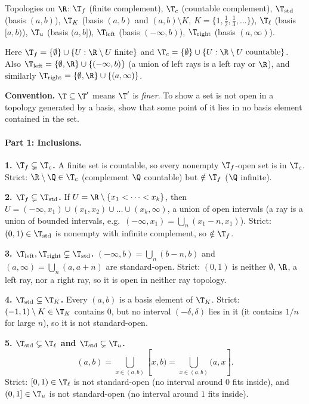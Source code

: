 
Topologies on $\R$: $\T_f$ (finite complement), $\T_c$ (countable complement), $\T_{\mathrm{std}}$
(basis $(a,b)$), $\T_K$ (basis $(a,b)$ and $(a,b)\setminus K$, $K=\{1,\tfrac12,\tfrac13,\dots\}$),
$\T_\ell$ (basis $[a,b)$), $\T_u$ (basis $(a,b]$), $\T_{\mathrm{left}}$ (basis $(-\infty,b)$),
$\T_{\mathrm{right}}$ (basis $(a,\infty)$).

Here $\T_f=\{\emptyset\}\cup\{U:\R\setminus U\text{ finite}\}$ and
$\T_c=\{\emptyset\}\cup\{U:\R\setminus U\text{ countable}\}$. Also
$\T_{\mathrm{left}}=\{\emptyset,\R\}\cup\{(-\infty,b)\}$ (a union of left rays is a left ray or
$\R$), and similarly $\T_{\mathrm{right}}=\{\emptyset,\R\}\cup\{(a,\infty)\}$.

\textbf{Convention.} $\T\subseteq\T'$ means $\T'$ is \emph{finer}. To show a set is not open in
a topology generated by a basis, show that some point of it lies in no basis element contained
in the set.

\paragraph{Part 1: Inclusions.}

\textbf{1. $\T_f\subsetneq\T_c$.} A finite set is countable, so every nonempty $\T_f$-open set
is in $\T_c$. Strict: $\R\setminus\Q\in\T_c$ (complement $\Q$ countable) but $\notin\T_f$ ($\Q$
infinite).

\textbf{2. $\T_f\subsetneq\T_{\mathrm{std}}$.} If $U=\R\setminus\{x_1<\dots<x_k\}$, then
$U=(-\infty,x_1)\cup(x_1,x_2)\cup\dots\cup(x_k,\infty)$, a union of open intervals (a ray is a
union of bounded intervals, e.g.\ $(-\infty,x_1)=\bigcup_n(x_1-n,x_1)$). Strict:
$(0,1)\in\T_{\mathrm{std}}$ is nonempty with infinite complement, so $\notin\T_f$.

\textbf{3. $\T_{\mathrm{left}},\T_{\mathrm{right}}\subsetneq\T_{\mathrm{std}}$.}
$(-\infty,b)=\bigcup_n(b-n,b)$ and $(a,\infty)=\bigcup_n(a,a+n)$ are standard-open. Strict:
$(0,1)$ is neither $\emptyset$, $\R$, a left ray, nor a right ray, so it is open in neither ray
topology.

\textbf{4. $\T_{\mathrm{std}}\subsetneq\T_K$.} Every $(a,b)$ is a basis element of $\T_K$.
Strict: $(-1,1)\setminus K\in\T_K$ contains $0$, but no interval $(-\delta,\delta)$ lies in it
(it contains $1/n$ for large $n$), so it is not standard-open.

\textbf{5. $\T_{\mathrm{std}}\subsetneq\T_\ell$ and $\T_{\mathrm{std}}\subsetneq\T_u$.}
\[ (a,b)=\bigcup_{x\in(a,b)}[x,b)=\bigcup_{x\in(a,b)}(a,x]. \]
Strict: $[0,1)\in\T_\ell$ is not standard-open (no interval around $0$ fits inside), and
$(0,1]\in\T_u$ is not standard-open (no interval around $1$ fits inside).

